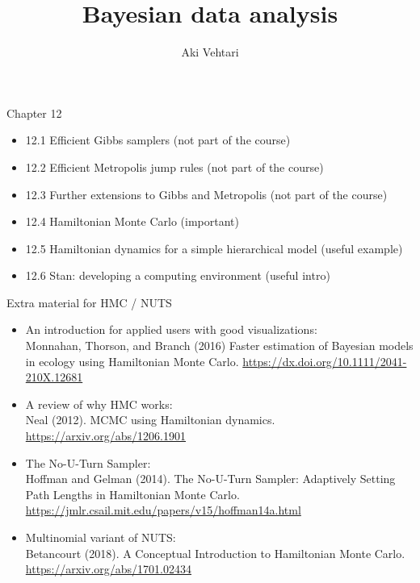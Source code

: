 \documentclass[finnish,english,t]{beamer}
\title[]{Bayesian data analysis}
\subtitle{}
\author{Aki Vehtari}
\institute[Aalto]{}
\begin{document}
\begin{frame}{Chapter 12}

  \begin{itemize}
  \item {\color{gray} 12.1 Efficient Gibbs samplers (not part of the course)}
  \item {\color{gray} 12.2 Efficient Metropolis jump rules (not part of the course)}
  \item {\color{gray} 12.3 Further extensions to Gibbs and Metropolis (not part of the course)}
  \item 12.4 Hamiltonian Monte Carlo (important)
  \item 12.5 Hamiltonian dynamics for a simple hierarchical model (useful example)
  \item 12.6 Stan: developing a computing environment (useful intro)
  \end{itemize}
\end{frame}

\begin{frame}{Extra material for HMC / NUTS}

  \begin{itemize}
  \item An introduction for applied users with good visualizations:\\
    Monnahan, Thorson, and Branch (2016)
    Faster estimation of Bayesian models in ecology using Hamiltonian
    Monte Carlo. \url{https://dx.doi.org/10.1111/2041-210X.12681}
  \item A review of why HMC works:\\
    Neal (2012). MCMC using Hamiltonian
    dynamics. \url{https://arxiv.org/abs/1206.1901}
  \item The No-U-Turn Sampler:\\
    Hoffman and Gelman (2014). The No-U-Turn
    Sampler: Adaptively Setting Path Lengths in Hamiltonian Monte
    Carlo. \url{https://jmlr.csail.mit.edu/papers/v15/hoffman14a.html}
  \item Multinomial variant of NUTS:\\
    Betancourt (2018).  A Conceptual Introduction to
    Hamiltonian Monte Carlo. \url{https://arxiv.org/abs/1701.02434}
  \end{itemize}

\end{frame}
\end{document}

